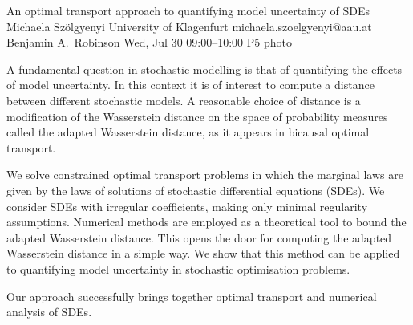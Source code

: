 \clearpage
\begin{talk}
  {An optimal transport approach to quantifying model uncertainty of SDEs}%
  {Michaela Sz\"olgyenyi}%
  {University of Klagenfurt}%
  {michaela.szoelgyenyi@aau.at}%
  {Benjamin A.~Robinson}%
  {}%
  {Wed, Jul 30 09:00--10:00}%
  {P5}%
  {photo}%
  
    
   
A fundamental question in stochastic modelling is that of quantifying the effects of model uncertainty. In this context it is of interest to compute a distance between different stochastic models. A  reasonable choice of distance is a modification of the Wasserstein distance on the space of probability measures called the adapted Wasserstein distance, as it appears in bicausal optimal transport.

 We solve constrained optimal transport problems in which the marginal laws are given by the laws of solutions of stochastic differential equations (SDEs). We consider SDEs with irregular coefficients, making only minimal regularity assumptions. Numerical methods are employed as a theoretical tool to bound the adapted Wasserstein distance. This opens the door for computing the adapted Wasserstein distance in a simple way. We show that this method can be applied to quantifying model uncertainty in stochastic optimisation problems.  
 
 Our approach successfully brings together optimal transport and numerical analysis of SDEs. 
\end{talk}


